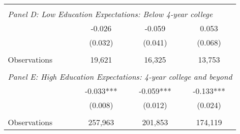 {\begin{tabular}{lccc}
&  &  &   \\
\multicolumn{4}{l}{\textit{Panel D: Low Education Expectations: Below 4-year college}} \\
\hspace{3mm}        &      -0.026   &      -0.059   &       0.053   \\
                    &     (0.032)   &     (0.041)   &     (0.068)   \\
                    &               &               &               \\
\hspace{3mm}Observations&      19,621   &      16,325   &      13,753   \\
 
&  &  &   \\
\multicolumn{4}{l}{\textit{Panel E: High Education Expectations: 4-year college and beyond}} \\
\hspace{3mm}        &      -0.033***&      -0.059***&      -0.133***\\
                    &     (0.008)   &     (0.012)   &     (0.024)   \\
                    &               &               &               \\
\hspace{3mm}Observations&     257,963   &     201,853   &     174,119   \\
 

\bottomrule
\end{tabular}
}
